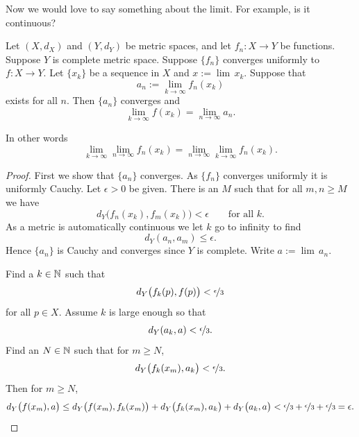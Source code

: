 Now we would love to say something about the limit.  For example, is it
continuous?


\begin{prop} \label{prop:uniformswitch}
Let $(X,d_X)$ and $(Y,d_Y)$ be metric spaces, and let
$f_n \colon X \to Y$ be functions.
Suppose $Y$ is complete metric space.
Suppose $\{ f_n \}$ converges uniformly to $f \colon X \to Y$.  
Let $\{ x_k \}$ be a sequence in $X$ and $x := \lim \, x_k$.  Suppose
that
\begin{equation*}
a_n := \lim_{k \to \infty} f_n(x_k)
\end{equation*}
exists for all $n$.  Then
$\{a_n\}$ converges and 
\begin{equation*}
\lim_{k \to \infty} f(x_k) = \lim_{n\to\infty} a_n .
\end{equation*}
\end{prop}

In other words
\begin{equation*}
\lim_{k \to \infty} \lim_{n\to\infty} f_n(x_k) =
\lim_{n \to \infty} \lim_{k\to\infty} f_n(x_k) .
\end{equation*}

\begin{proof}
First we show that $\{ a_n \}$ converges.  As
$\{ f_n \}$ converges uniformly it is uniformly Cauchy. 
Let $\epsilon > 0$ be given.  There is
an $M$ such that for all $m,n \geq M$ we have
\begin{equation*}
d_Y\bigl(f_n(x_k),f_m(x_k)\bigr) < \epsilon \qquad \text{for all } k .
\end{equation*}
As a metric is automatically continuous we let $k$ go to infinity
to find
\begin{equation*}
d_Y(a_n,a_m) \leq \epsilon .
\end{equation*}
Hence $\{a_n\}$ is Cauchy and converges since $Y$ is complete.  Write
$a := \lim \, a_n$.

Find a $k \in {\mathbb{N}}$ such that
\begin{equation*}
d_Y\bigl(f_k(p),f(p)\bigr) < \nicefrac{\epsilon}{3}
\end{equation*}
for all $p \in X$.  Assume $k$ is large enough
so that
\begin{equation*}
d_Y(a_k,a) < \nicefrac{\epsilon}{3}  .
\end{equation*}
Find an $N \in {\mathbb{N}}$ such that for $m \geq N$,
\begin{equation*}
d_Y\bigl(f_k(x_m),a_k\bigr) < \nicefrac{\epsilon}{3}  .
\end{equation*}
Then for
$m \geq N$,
\begin{equation*}
d_Y\bigl(f(x_m),a\bigr)
\leq
d_Y\bigl(f(x_m),f_k(x_m)\bigr)
+
d_Y\bigl(f_k(x_m),a_k\bigr)
+
d_Y\bigl(a_k,a\bigr)
<
\nicefrac{\epsilon}{3} +
\nicefrac{\epsilon}{3} +
\nicefrac{\epsilon}{3} = \epsilon . \qedhere
\end{equation*}
\end{proof}

